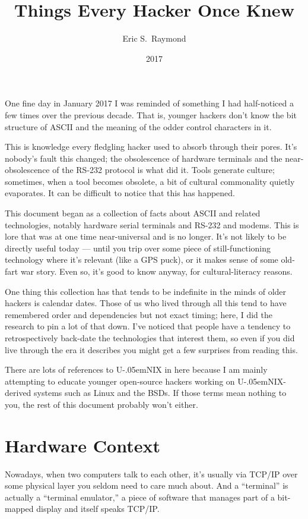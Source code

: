 \documentclass[12pt,letterpaper]{article}
\title{Things Every Hacker Once Knew}
\author{Eric S.~Raymond}
\date{2017}
\newcommand{\mc}{\small}
\newcommand{\acro}[1]{{\mc #1\spacefactor1000}}
\def\UNIX/{{\mc U\kern-.05emNIX\spacefactor1000}}%
\def\ASCII/{\acro{ASCII}}%
\def\RSTTT/{\acro{RS-232}}%
\begin{document}
\maketitle
\vspace{1in}
\tableofcontents

\clearpage

\noindent One fine day in January 2017 I was reminded of something I had half-noticed a
few times over the previous decade. That is, younger hackers don't know the bit
structure of \ASCII/ and the meaning of the odder control characters in it.

This is knowledge every fledgling hacker used to absorb through their pores.
It's nobody's fault this changed; the obsolescence of hardware terminals and
the near-obsolescence of the \RSTTT/ protocol is what did it. Tools generate
culture; sometimes, when a tool becomes obsolete, a bit of cultural commonality
quietly evaporates. It can be difficult to notice that this has happened.

This document began as a collection of facts about \ASCII/ and related
technologies, notably hardware serial terminals and \RSTTT/ and modems. This is
lore that was at one time near-universal and is no longer. It's not likely to
be directly useful today  ---  until you trip over some piece of still-functioning
technology where it's relevant (like a \acro{GPS} puck), or it makes sense of some
old-fart war story. Even so, it's good to know anyway, for cultural-literacy
reasons.

One thing this collection has that tends to be indefinite in the minds of older
hackers is calendar dates. Those of us who lived through all this tend to have
remembered order and dependencies but not exact timing; here, I did the
research to pin a lot of that down. I've noticed that people have a tendency to
retrospectively back-date the technologies that interest them, so even if you
did live through the era it describes you might get a few surprises from
reading this.

There are lots of references to \UNIX/ in here because I am mainly attempting to
educate younger open-source hackers working on \UNIX/-derived systems such as
Linux and the \acro{BSD}s. If those terms mean nothing to you, the rest of this
document probably won't either.

\section{Hardware Context}
Nowadays, when two computers talk to each other, it's usually via \acro{TCP/IP} over
some physical layer you seldom need to care much about. And a ``terminal'' is
actually a ``terminal emulator,'' a piece of software that manages part of a
bit-mapped display and itself speaks \acro{TCP/IP}.
\end{document}
